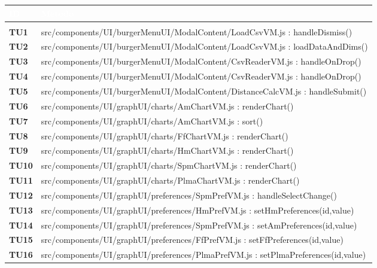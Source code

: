 {

\renewcommand{\arraystretch}{1.5}
\renewcommand\extrarowheight{1.5pt}
\setlength\arrayrulewidth{1pt}
\begin{longtable}{C{1.1cm} | L{15cm}} 
		\textcolor{white}{\textbf{ID}} & 
		\textcolor{white}{\textbf{Metodo}} \\
		\endfirsthead
		\\
	    \endfoot
	    \endlastfoot
	  		
		\textbf{TU1} & src/components/UI/burgerMenuUI/ModalContent/LoadCsvVM.js : handleDismiss()\\
		\textbf{TU2} & src/components/UI/burgerMenuUI/ModalContent/LoadCsvVM.js : loadDataAndDims()\\
		\textbf{TU3} & src/components/UI/burgerMenuUI/ModalContent/CsvReaderVM.js : handleOnDrop()\\
		\textbf{TU4} & src/components/UI/burgerMenuUI/ModalContent/CsvReaderVM.js : handleOnDrop()\\
		\textbf{TU5} & src/components/UI/burgerMenuUI/ModalContent/DistanceCalcVM.js : handleSubmit()\\
		\textbf{TU6} & src/components/UI/graphUI/charts/AmChartVM.js : renderChart()\\
		\textbf{TU7} & src/components/UI/graphUI/charts/AmChartVM.js : sort()\\
		\textbf{TU8} & src/components/UI/graphUI/charts/FfChartVM.js : renderChart()\\
		\textbf{TU9} & src/components/UI/graphUI/charts/HmChartVM.js : renderChart()\\
		\textbf{TU10} & src/components/UI/graphUI/charts/SpmChartVM.js : renderChart()\\
		\textbf{TU11} & src/components/UI/graphUI/charts/PlmaChartVM.js : renderChart()\\
		\textbf{TU12} & src/components/UI/graphUI/preferences/SpmPrefVM.js : handleSelectChange()\\
		\textbf{TU13} & src/components/UI/graphUI/preferences/HmPrefVM.js : setHmPreferences(id,value)\\
	\textbf{TU14} & src/components/UI/graphUI/preferences/SpmPrefVM.js : setAmPreferences(id,value)\\	
	\textbf{TU15} & src/components/UI/graphUI/preferences/FfPrefVM.js : setFfPreferences(id,value)\\
	\textbf{TU16} & src/components/UI/graphUI/preferences/PlmaPrefVM.js : setPlmaPreferences(id,value)\\

\end{longtable}}
